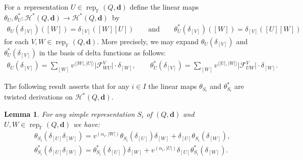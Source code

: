 \documentclass[pdftex]{sigma}
\numberwithin{equation}{section}
\newtheorem{Lemma}[Theorem]{Lemma}
\begin{document}
For a~representation $U\in\operatorname{rep}_\mathbb{F}(Q,\mathbf{d})$ def\/ine the linear maps $\theta_U,\theta_U^*:
\mathcal{H}^*(Q,\mathbf{d})\to\mathcal{H}^*(Q,\mathbf{d})$~by
\begin{gather}
\label{eq:higher derivations}
\theta_U(\delta_{[V]})([W])=\delta_{[V]}([W][U])
\qquad
\text{and}
\qquad
\theta_U^*(\delta_{[V]})([W])=\delta_{[V]}([U][W])
\end{gather}
for each $V,W\in\operatorname{rep}_\mathbb{F}(Q,\mathbf{d})$.
More precisely, we may expand $\theta_U(\delta_{[V]})$ and $\theta_U^*(\delta_{[V]})$ in the basis of delta functions as
follows:
\begin{gather*}
\theta_U(\delta_{[V]}) =\sum\limits_{[W]}v^{\langle|W|,|U|\rangle}\big|\mathcal{F}_{WU}^V\big|\cdot\delta_{[W]}, \qquad
\theta_U^*(\delta_{[V]}) =\sum\limits_{[W]}v^{\langle|U|,|W|\rangle}\big|\mathcal{F}_{UW}^V\big|\cdot\delta_{[W]}.
\end{gather*}

The following result asserts that for any $i\in I$ the linear maps $\theta_{S_i}$ and $\theta_{S_i}^*$ are twisted
derivations on $\mathcal{H}^*(Q,\mathbf{d})$.
\begin{Lemma}
For any simple representation $S_i$ of $(Q,\mathbf{d})$ and $U,W\in\operatorname{rep}_\mathbb{F}(Q,\mathbf{d})$ we have:
\begin{gather*}
\theta_{S_i}(\delta_{[U]}\delta_{[W]}) =v^{(\alpha_i,|W|)}\theta_{S_i}(\delta_{[U]})\delta_{[W]}+\delta_{[U]}\theta_{S_i}(\delta_{[W]}),
\\
\theta_{S_i}^*(\delta_{[U]}\delta_{[W]}) =\theta^*_{S_i}(\delta_{[U]})\delta_{[W]}+v^{(\alpha_i,|U|)}\delta_{[U]}\theta^*_{S_i}(\delta_{[W]}).
\end{gather*}
\end{Lemma}
\end{document}
